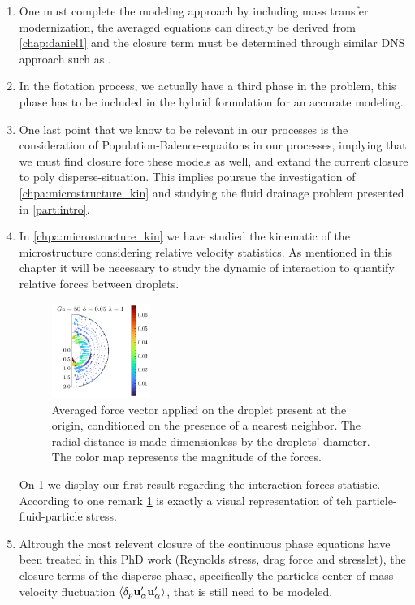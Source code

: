 \begin{enumerate}
    \item One must complete the modeling approach by including mass transfer modernization, the averaged equations can directly be derived from \ref{chap:daniel1} and the closure term must be determined through similar DNS approach such as \citep{hidman2023assessing}. 
    \item In the flotation process, we actually have a third phase in the problem, this phase has to be included in the hybrid formulation for an accurate modeling. 
    \item One last point that we know to be relevant in our processes is the consideration of Population-Balence-equaitons in our processes, implying that we must find closure fore these models as well, and extand the current closure to poly disperse-situation. 
    This implies poursue the investigation of \ref{chpa:microstructure_kin} and studying the fluid drainage problem presented in \ref{part:intro}. 
    \item In \ref{chpa:microstructure_kin} we have studied the kinematic of the microstructure considering relative velocity statistics. 
    As mentioned in this chapter it will be necessary to study the dynamic of interaction to quantify relative forces between droplets. 
    \begin{figure}[h!]
        \centering
        \includegraphics[width=0.3\textwidth]{image/HOMOGENEOUS_final/Dist/F_rel_l_1_Ga_80_PHI_5}
        \caption{Averaged force vector applied on the droplet present at the origin, conditioned on the presence of a nearest neighbor.
        The radial distance is made dimensionless by the droplets' diameter. 
        The color map represents the magnitude of the forces.}
        \label{fig:perspective_forces}
    \end{figure}
    On \ref{fig:perspective_forces} we display our first result regarding the interaction forces statistic. 
    According to \citet{zhang2021ensemble} one remark \ref{fig:perspective_forces} is exactly a visual representation of teh particle-fluid-particle stress. 
    \item Altrough the most relevent closure of the continuous phase equations have been treated in this PhD work (Reynolds stress, drag force and stresslet), the closure terms of the disperse phase, specifically the particles center of mass velocity fluctuation $\left<\delta_p \textbf{u}_\alpha'\textbf{u}_\alpha'\right>$, that is still need to be modeled. 

\end{enumerate}

